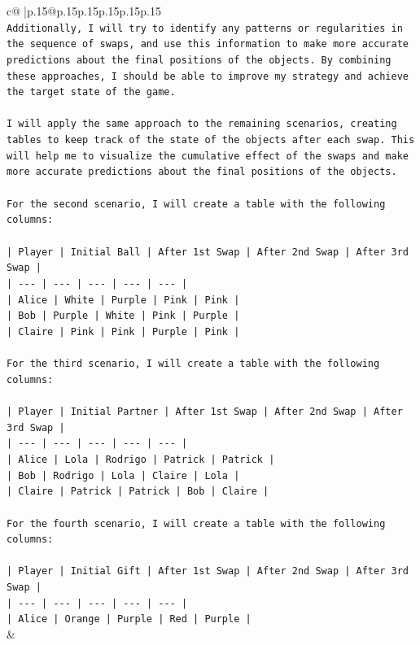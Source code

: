 \documentclass{article}
\begin{document}
{\begin{supertabular}{c@{$\;$}|p{.15\linewidth}@{}p{.15\linewidth}p{.15\linewidth}p{.15\linewidth}p{.15\linewidth}p{.15\linewidth}}
{{{\\ 
\texttt{Additionally, I will try to identify any patterns or regularities in the sequence of swaps, and use this information to make more accurate predictions about the final positions of the objects. By combining these approaches, I should be able to improve my strategy and achieve the target state of the game.} \\
\\ 
\texttt{I will apply the same approach to the remaining scenarios, creating tables to keep track of the state of the objects after each swap. This will help me to visualize the cumulative effect of the swaps and make more accurate predictions about the final positions of the objects.} \\
\\ 
\texttt{For the second scenario, I will create a table with the following columns:} \\
\\ 
\texttt{| Player | Initial Ball | After 1st Swap | After 2nd Swap | After 3rd Swap |} \\
\texttt{| {-}{-}{-} | {-}{-}{-} | {-}{-}{-} | {-}{-}{-} | {-}{-}{-} |} \\
\texttt{| Alice | White | Purple | Pink | Pink |} \\
\texttt{| Bob | Purple | White | Pink | Purple |} \\
\texttt{| Claire | Pink | Pink | Purple | Pink |} \\
\\ 
\texttt{For the third scenario, I will create a table with the following columns:} \\
\\ 
\texttt{| Player | Initial Partner | After 1st Swap | After 2nd Swap | After 3rd Swap |} \\
\texttt{| {-}{-}{-} | {-}{-}{-} | {-}{-}{-} | {-}{-}{-} | {-}{-}{-} |} \\
\texttt{| Alice | Lola | Rodrigo | Patrick | Patrick |} \\
\texttt{| Bob | Rodrigo | Lola | Claire | Lola |} \\
\texttt{| Claire | Patrick | Patrick | Bob | Claire |} \\
\\ 
\texttt{For the fourth scenario, I will create a table with the following columns:} \\
\\ 
\texttt{| Player | Initial Gift | After 1st Swap | After 2nd Swap | After 3rd Swap |} \\
\texttt{| {-}{-}{-} | {-}{-}{-} | {-}{-}{-} | {-}{-}{-} | {-}{-}{-} |} \\
\texttt{| Alice | Orange | Purple | Red | Purple |} \\
            }
        }
    }
    & \\ \\

\end{supertabular}
}
\end{document}
